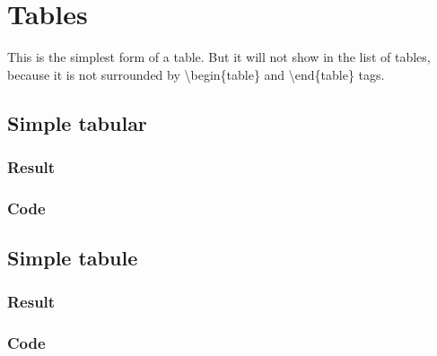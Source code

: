 \newcommand\example[2]{\subsection{#1}\subsubsection{Result}\subsubsection{Code}}
\section{Tables}
This is the simplest form of a table. But it will not show in the list of tables, because it is not surrounded by \textbackslash begin\{table\} and \textbackslash end\{table\} tags.
\example{Simple tabular}{simpletabular.tex}
\example{Simple tabule}{simpletable.tex}

